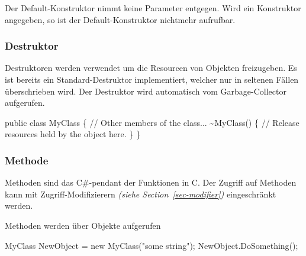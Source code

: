\documentclass[
  letterpaper,
  DIV=11,
  numbers=noendperiod]{scrartcl}
\newenvironment{Shaded}{\begin{snugshade}}{\end{snugshade}}
\newcommand{\CommentTok}[1]{\textcolor[rgb]{0.37,0.37,0.37}{#1}}
\newcommand{\FunctionTok}[1]{\textcolor[rgb]{0.28,0.35,0.67}{#1}}
\newcommand{\KeywordTok}[1]{\textcolor[rgb]{0.00,0.23,0.31}{#1}}
\newcommand{\NormalTok}[1]{\textcolor[rgb]{0.00,0.23,0.31}{#1}}
\newcommand{\OperatorTok}[1]{\textcolor[rgb]{0.37,0.37,0.37}{#1}}
\newcommand{\StringTok}[1]{\textcolor[rgb]{0.13,0.47,0.30}{#1}}
\begin{document}
\begin{multicols}{2}
\begin{tcolorbox}[enhanced jigsaw, arc=.35mm, colbacktitle=quarto-callout-tip-color!10!white, title=\textcolor{quarto-callout-tip-color}{\faLightbulb}\hspace{0.5em}{Tip}, coltitle=black, titlerule=0mm, opacitybacktitle=0.6, left=2mm, colback=white, rightrule=.15mm, breakable, opacityback=0, leftrule=.75mm, bottomtitle=1mm, toptitle=1mm, bottomrule=.15mm, toprule=.15mm, colframe=quarto-callout-tip-color-frame]

Der Default-Konstruktor nimmt keine Parameter entgegen. Wird ein
Konstruktor angegeben, so ist der Default-Konstruktor nichtmehr
aufrufbar.

\end{tcolorbox}

\hypertarget{destruktor}{%
\subsubsection{Destruktor}\label{destruktor}}

Destruktoren werden verwendet um die Resourcen von Objekten freizugeben.
Es ist bereits ein Standard-Destruktor implementiert, welcher nur in
seltenen Fällen überschrieben wird. Der Destruktor wird automatisch vom
Garbage-Collector aufgerufen.

\begin{Shaded}
\begin{Highlighting}[]
\KeywordTok{public} \KeywordTok{class}\NormalTok{ MyClass}
\OperatorTok{\{}
    \CommentTok{// Other members of the class...}
    \OperatorTok{\textasciitilde{}}\FunctionTok{MyClass}\OperatorTok{()}
    \OperatorTok{\{}
        \CommentTok{// Release resources held by the object here.}
    \OperatorTok{\}}
\OperatorTok{\}}
\end{Highlighting}
\end{Shaded}

\hypertarget{methode}{%
\subsubsection{Methode}\label{methode}}

Methoden sind das C\#-pendant der Funktionen in C. Der Zugriff auf
Methoden kann mit Zugriff-Modifizierern \emph{(siehe
Section~\ref{sec-modifier})} eingeschränkt werden.

Methoden werden über Objekte aufgerufen

\begin{Shaded}
\begin{Highlighting}[]
\NormalTok{MyClass NewObject }\OperatorTok{=} \KeywordTok{new} \FunctionTok{MyClass}\OperatorTok{(}\StringTok{"some string"}\OperatorTok{);}
\NormalTok{NewObject}\OperatorTok{.}\FunctionTok{DoSomething}\OperatorTok{();}


\end{Highlighting}
\end{Shaded}
\end{multicols}
\end{document}

